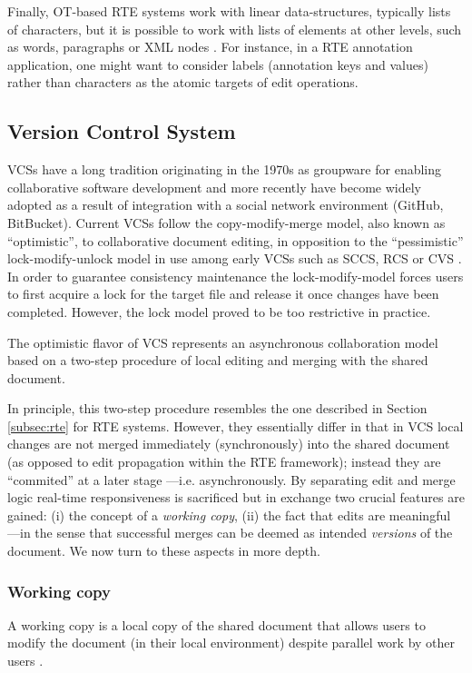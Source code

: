 \documentclass{sig-alternate}
\begin{document}
Finally, OT-based RTE systems work with linear data-structures, typically lists of
characters, but it is possible to work with lists of elements at other levels, such as words,
paragraphs or XML nodes \cite{Imine2009,SuClarence}. For instance, in a RTE annotation application,
one might want to consider labels (annotation keys and values) rather than characters as the
atomic targets of edit operations.


\subsection{Version Control System}\label{subsec:vcs}

VCSs have a long tradition originating in the 1970s as groupware for enabling collaborative
software development and more recently have become widely adopted as a result of
integration with a social network environment (GitHub, BitBucket).
Current VCSs follow the copy-modify-merge model, also known as ``optimistic'', to
collaborative document editing, in opposition to the ``pessimistic'' lock-modify-unlock model
in use among early VCSs such as SCCS, RCS or CVS \cite{Loeliger2012}.
In order to guarantee consistency maintenance the lock-modify-model forces users to first
acquire a lock for the target file and release it once changes have been completed. However, 
the lock model proved to be too restrictive in practice.

The optimistic flavor of VCS represents an asynchronous collaboration model based on a
two-step procedure of local editing and merging with the shared document.

In principle, this two-step procedure resembles the one described in Section \ref{subsec:rte}
for RTE systems. However, they essentially differ in that in VCS local changes are not merged
immediately (synchronously) into the shared document (as opposed to edit propagation
within the RTE framework); instead they are ``commited'' at a later stage ---i.e. asynchronously.
By separating edit and merge logic real-time responsiveness is
sacrificed but in exchange two crucial features are gained: (i) the concept of a
\textit{working copy}, (ii) the fact that edits are meaningful ---in the sense
that successful merges can be deemed as intended \textit{versions} of the document.
We now turn to these aspects in more depth.

\subsubsection{Working copy}\label{subsec:workingcopy}
A working copy is a local copy of the shared document that allows users
to modify the document (in their local environment) despite parallel work by other users
\cite{Collins-Sussman}.
\end{document}
